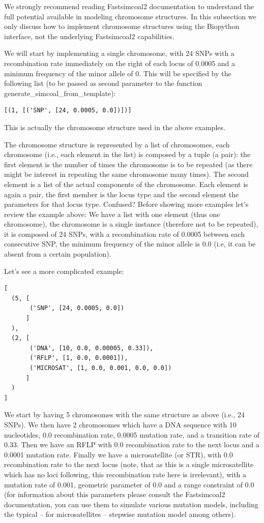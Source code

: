 \documentclass{report}
\begin{document}
We strongly recommend reading Fastsimcoal2 documentation to understand the full potential
available in modeling chromosome structures. In this subsection we only discuss how
to implement chromosome structures using the Biopython interface, not the underlying
Fastsimcoal2 capabilities.

We will start by implementing a single chromosome, with 24 SNPs with
a recombination rate immediately on the right of each locus of 0.0005 and a
minimum frequency of the minor allele of 0. This will be specified by the
following list (to be passed as second parameter to the function
generate\_simcoal\_from\_template):

\begin{verbatim}
[(1, [('SNP', [24, 0.0005, 0.0])])]
\end{verbatim}

This is actually the chromosome structure used in the above examples.


The chromosome structure is represented by a list of chromosomes,
each chromosome (i.e., each element in the list)
is composed by a tuple (a pair): the first element
is the number of times the chromosome is to be repeated (as there
might be interest in repeating the same chromosome many times).
The second element is a list of the actual components of the chromosome.
Each element is again a pair, the first member is the locus type and
the second element the parameters for that locus type. Confused?
Before showing more examples let's review the example above: We have
a list with one element (thus one chromosome), the chromosome is
a single instance (therefore not to be repeated), it is composed
of 24 SNPs, with a recombination rate of 0.0005 between each
consecutive SNP, the minimum frequency of the minor allele is
0.0 (i.e, it can be absent from a certain population).

Let's see a more complicated example:

\begin{verbatim}
[
  (5, [
       ('SNP', [24, 0.0005, 0.0])
      ]
  ),
  (2, [
       ('DNA', [10, 0.0, 0.00005, 0.33]),
       ('RFLP', [1, 0.0, 0.0001]),
       ('MICROSAT', [1, 0.0, 0.001, 0.0, 0.0])
      ]
  )
]
\end{verbatim}

We start by having 5 chromosomes with the same structure as
above (i.e., 24 SNPs). We then have 2 chromosomes which
have a DNA sequence with 10 nucleotides, 0.0 recombination rate,
0.0005 mutation rate, and a transition rate of 0.33. Then we
have an RFLP with 0.0 recombination rate to the next locus and
a 0.0001 mutation rate. Finally we have a microsatellite (or STR),
with 0.0 recombination rate to the next locus (note, that as this
is a single microsatellite which has no loci following, this
recombination rate here is irrelevant), with a mutation rate
of 0.001, geometric parameter of 0.0 and a range constraint
of 0.0 (for information about this parameters please consult
the Fastsimcoal2 documentation, you can use them to simulate
various mutation models, including the typical  -- for microsatellites --
stepwise mutation model among others).
\end{document}
